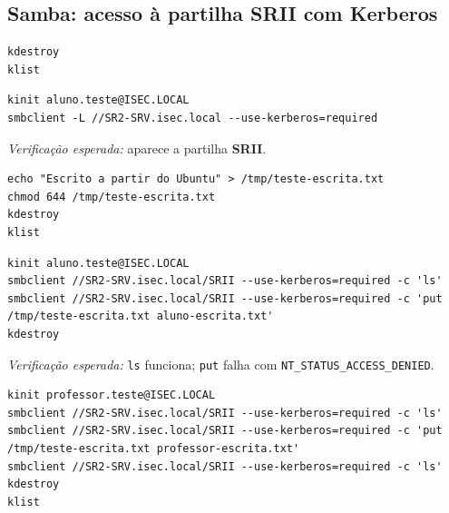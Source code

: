 
\subsection[Samba: acesso à partilha SRII com Kerberos]{Samba: acesso à partilha SRII com Kerberos}


\begin{lstlisting}[style=bashstyle]
kdestroy
klist
\end{lstlisting}


\begin{lstlisting}[style=bashstyle]
kinit aluno.teste@ISEC.LOCAL
smbclient -L //SR2-SRV.isec.local --use-kerberos=required
\end{lstlisting}

\emph{Verificação esperada:} aparece a partilha \textbf{SRII}.


\begin{lstlisting}[style=bashstyle]
echo "Escrito a partir do Ubuntu" > /tmp/teste-escrita.txt
chmod 644 /tmp/teste-escrita.txt
kdestroy
klist
\end{lstlisting}


\begin{lstlisting}[style=bashstyle]
kinit aluno.teste@ISEC.LOCAL
smbclient //SR2-SRV.isec.local/SRII --use-kerberos=required -c 'ls'
smbclient //SR2-SRV.isec.local/SRII --use-kerberos=required -c 'put /tmp/teste-escrita.txt aluno-escrita.txt'
kdestroy
\end{lstlisting}

\emph{Verificação esperada:} \texttt{ls} funciona; \texttt{put} falha com \texttt{NT\_STATUS\_ACCESS\_DENIED}.


\begin{lstlisting}[style=bashstyle]
kinit professor.teste@ISEC.LOCAL
smbclient //SR2-SRV.isec.local/SRII --use-kerberos=required -c 'ls'
smbclient //SR2-SRV.isec.local/SRII --use-kerberos=required -c 'put /tmp/teste-escrita.txt professor-escrita.txt'
smbclient //SR2-SRV.isec.local/SRII --use-kerberos=required -c 'ls'
kdestroy
klist
\end{lstlisting}

